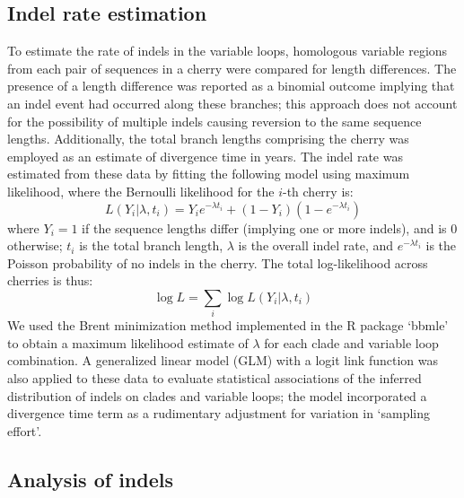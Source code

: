 \documentclass[12pt]{article}
\begin{document}
\subsection * {Indel rate estimation}

To estimate the rate of indels in the variable loops, homologous variable regions from each pair of sequences in a cherry were compared for length differences. 
The presence of a length difference was reported as a binomial outcome implying that an indel event had occurred along these branches; this approach does not account for the possibility of multiple indels causing reversion to the same sequence lengths.  
Additionally, the total branch lengths comprising the cherry was employed as an estimate of divergence time in years.  
The indel rate was estimated from these data by fitting the following model using maximum likelihood, where the Bernoulli likelihood for the $i$-th cherry is: 
\[%
L(Y_i | \lambda, t_i) = Y_i e^{-\lambda t_i} + (1-Y_i) (1-e^{-\lambda t_i})
\]%
where $Y_i=1$ if the sequence lengths differ (implying one or more indels), and is $0$ otherwise; $t_i$ is the total branch length, $\lambda$ is the overall indel rate, and $e^{-\lambda t_i}$ is the Poisson probability of no indels in the cherry.
The total log-likelihood across cherries is thus:
\[%
\log L = \sum_{i} \log L(Y_i | \lambda, t_i)
\]%
We used the Brent minimization method implemented in the R package `bbmle' to obtain a maximum likelihood estimate of $\lambda$ for each clade and variable loop combination.
A generalized linear model (GLM) with a logit link function was also applied to these data to evaluate statistical associations of the inferred distribution of indels on clades and variable loops; the model incorporated a divergence time term as a rudimentary adjustment for variation in `sampling effort'. 


\subsection * {Analysis of indels}
\end{document}
